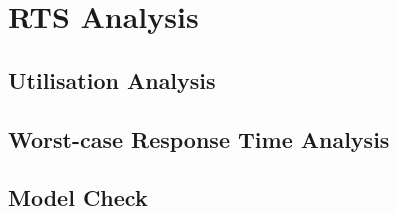 \section{RTS Analysis}

\subsection{Utilisation Analysis}

\subsection{Worst-case Response Time Analysis}

\subsection{Model Check}
